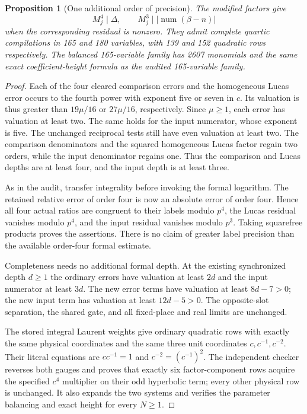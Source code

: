 \documentclass[11pt]{article}
\newtheorem{proposition}[theorem]{Proposition}
\theoremstyle{remark}\newtheorem{remark}[theorem]{Remark}
\begin{document}
\begin{proposition}[One additional order of precision]
The modified factors give
\[
 M_j^4\mid\Delta,
 \qquad M_j^3\mid |\operatorname{num}(\beta-n)|
\]
when the corresponding residual is nonzero. They admit complete
quartic compilations in 165 and 180 variables, with 139 and 152
quadratic rows respectively. The balanced 165-variable family has
2607 monomials and the same exact coefficient-height formula as the
audited 165-variable family.
\end{proposition}
\begin{proof}
Each of the four cleared comparison errors and the homogeneous Lucas
error occurs to the fourth power with exponent five or seven in $c$.
Its valuation is thus greater than $19\mu/16$ or $27\mu/16$,
respectively. Since $\mu\ge1$, each error has valuation at least two.
The same holds for the input numerator, whose exponent is five.
The unchanged reciprocal tests still have even valuation at least two.
The comparison denominators and the squared homogeneous Lucas
factor regain two orders, while the input denominator regains one.
Thus the comparison and Lucas depths are at least four, and the input
depth is at least three.

As in the audit, transfer integrality before invoking the formal
logarithm. The retained relative error of order four is now an
absolute error of order four. Hence all four actual ratios are
congruent to their labels modulo $p^4$, the Lucas residual vanishes
modulo $p^4$, and the input residual vanishes modulo $p^3$.
Taking squarefree products proves the assertions. There is no
claim of greater label precision than the available order-four
formal estimate.

Completeness needs no additional formal depth. At the existing
synchronized depth $d\ge1$ the ordinary errors have valuation at
least $2d$ and the input numerator at least $3d$. The new error
terms have valuation at least $8d-7>0$; the new input term has
valuation at least $12d-5>0$. The opposite-slot separation, the
shared gate, and all fixed-place and real limits are unchanged.

The stored integral Laurent weights give ordinary quadratic rows
with exactly the same physical coordinates and the same three
unit coordinates $c,c^{-1},c^{-2}$. Their literal equations are
$c c^{-1}=1$ and $c^{-2}=(c^{-1})^2$. The independent checker
reverses both gauges and proves that exactly six factor-component
rows acquire the specified $c^4$ multiplier on their odd
hyperbolic term; every other physical row is unchanged. It also
expands the two systems and verifies the parameter balancing and
exact height for every $N\ge1$.
\end{proof}
\end{document}
